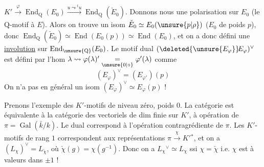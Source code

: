  $K'\xrightarrow{\varphi}\operatorname{End}_{\mathrm Q}(E_0)\xrightarrow{u\leadsto{}^tu}\operatorname{End}_{\mathrm Q}(\check E_0)$. Donnons
nous une polarisation sur $E_0$ (le $\mathrm Q$-motif  à $E$).
Alors on trouve un isom $\check E_0\simeq E_0(\unsure{p|\rho})$
($E_0$ de poids $p$), donc 
$\operatorname{End}_{\mathrm Q}(\check E_0)\simeq\operatorname{End}(E_0(p))\simeq\operatorname{End}(E_0)$, et on a donc défini
une \uline{involution}  sur $\operatorname{End}_{\unsure{\mathrm Q}}(E_0)$. Le motif dual $(\deleted{\unsure{E_\varphi}}\!E_\varphi)^\vee$
 est défini par l'hom $\lambda\leadsto\varphi(\lambda)'\underset{\unsure{0|\circ}}{=}\varphi'(\lambda)$ comme
\[
\boxed{(E_\varphi)^\vee=(E_{\varphi'})(p)}
\]
On n'a pas en général un isom $(E_\varphi)^\vee\simeq E_\varphi(p)$ !

Prenons l'exemple des $K'$-motifs de niveau zéro,
poids $0$. La catégorie est équivalente à la catégorie
des vectoriels de dim finie sur $K'$, 
 à opération  de $\pi=\operatorname{Gal}(\bar k/k)$. Le dual
correspond à l'opération contragrédiente de $\pi$. Les
$K'$-motifs de rang $1$  correspondent aux
représentations   $\pi\xrightarrow{\chi}K'{}^*$, et on a
$(L_\chi)^\vee=L_{\check\chi}$, où $\check\chi(g)=\chi(g^{-1})$. Donc
on a $L_\chi{}^\vee\simeq L_\chi$ ssi $\chi=\check\chi$ i.e. $\chi$ est
à valeurs dans $\pm1$ !
